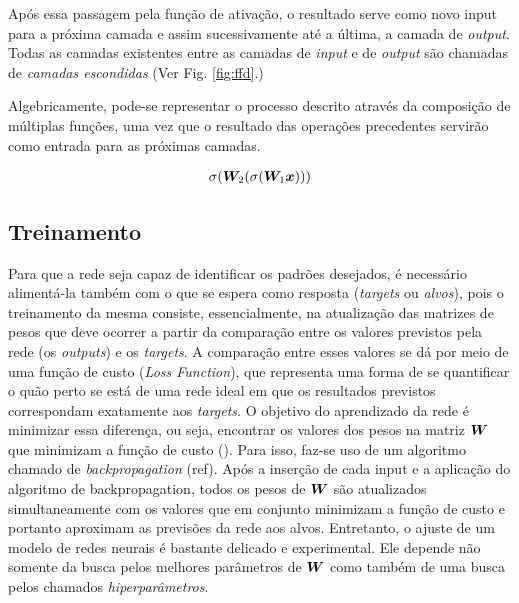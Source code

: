 Após essa passagem pela função de ativação, o resultado serve como novo input para a próxima camada e assim sucessivamente até a última, a camada de \textit{output}. Todas as camadas existentes entre as camadas de \textit{input} e de \textit{output} são chamadas de \textit{camadas escondidas} (Ver Fig. \ref{fig:ffd}.)


Algebricamente, pode-se representar o processo descrito através da composição de múltiplas funções, uma vez que o resultado das operações precedentes servirão como entrada para as próximas camadas.

\begin{align}
\sigma(\bm{W}_2 (\sigma(\bm{W}_1\bm{x})))
\end{align}



\subsection{Treinamento}

Para que a rede seja capaz de identificar os padrões desejados, é necessário alimentá-la também com o que se espera como resposta (\textit{targets} ou \textit{alvos}), pois o treinamento da mesma consiste, essencialmente, na atualização das matrizes de pesos que deve ocorrer a partir da comparação entre os valores previstos pela rede (os \textit{outputs}) e os \textit{targets}. A comparação entre esses valores se dá por meio de uma função de custo (\textit{Loss Function}), que representa uma forma de se quantificar o quão perto se está de uma rede ideal em que os resultados previstos correspondam exatamente aos \textit{targets}. O objetivo do aprendizado da rede é minimizar essa diferença, ou seja, encontrar os valores dos pesos na matriz $\bm{W}$ que minimizam a função de custo (\cite{josh:2017}). Para isso, faz-se uso de um algoritmo chamado de \textit{backpropagation} (ref). Após a inserção de cada input e a aplicação do algoritmo de backpropagation, todos os pesos de $\bm{W}$ são atualizados simultaneamente com os valores que em conjunto minimizam a função de custo e portanto aproximam as previsões da rede aos alvos. Entretanto, o ajuste de um modelo de redes neurais é bastante delicado e experimental. Ele depende não somente da busca pelos melhores parâmetros de $\bm{W}$ como também de uma busca pelos chamados \textit{hiperparâmetros}. 

